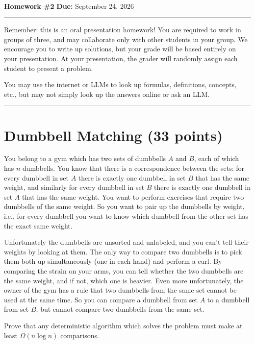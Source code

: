 \documentclass[11pt]{article}
\begin{document}
\\
{{\bf Homework \#2}} \hfill {{\bf Due:} September 24, 2026} \\
\rule[0.1in]{\textwidth}{0.4pt}

Remember: this is an oral presentation homework!  You are required to work in groups of three, and may collaborate only with other students in your group. 
We encourage you to write up solutions, but your grade will be based entirely on your presentation. 
At your presentation, the grader will randomly assign each student to present a problem. 

You may use the internet or LLMs to look up formulas, definitions, concepts, etc., but may not simply look up the answers online or ask an LLM.  


\noindent \rule[0.1in]{\textwidth}{0.4pt}

\section{Dumbbell Matching (33 points)}
You belong to a gym which has two sets of dumbbells $A$ and $B$, each of which has $n$ dumbbells. 
You know that there is a correspondence between the sets: for every dumbbell in set $A$ there is exactly one dumbbell in set $B$ that has the same weight, 
and similarly for every dumbbell in set $B$ there is exactly one dumbbell in set $A$ that has the same weight. 
You want to perform exercises that require two dumbbells of the same weight.  So you want to pair up the dumbbells by weight, 
i.e., for every dumbbell you want to know which dumbbell from the other set has the exact same weight.

Unfortunately the dumbbells are unsorted and unlabeled, and you can't tell their weights by looking at them. 
The only way to compare two dumbbells is to pick them both up simultaneously (one in each hand) and perform a curl. 
By comparing the strain on your arms, you can tell whether the two dumbbells are the same weight, and if not, which one is heavier. 
Even more unfortunately, the owner of the gym has a rule that two dumbbells from the same set cannot be used at the same time. 
So you can compare a dumbbell from set $A$ to a dumbbell from set $B$, but cannot compare two dumbbells from the same set.  

Prove that any deterministic algorithm which solves the problem must make at least $\Omega(n \log n)$ comparisons.
\end{document}
